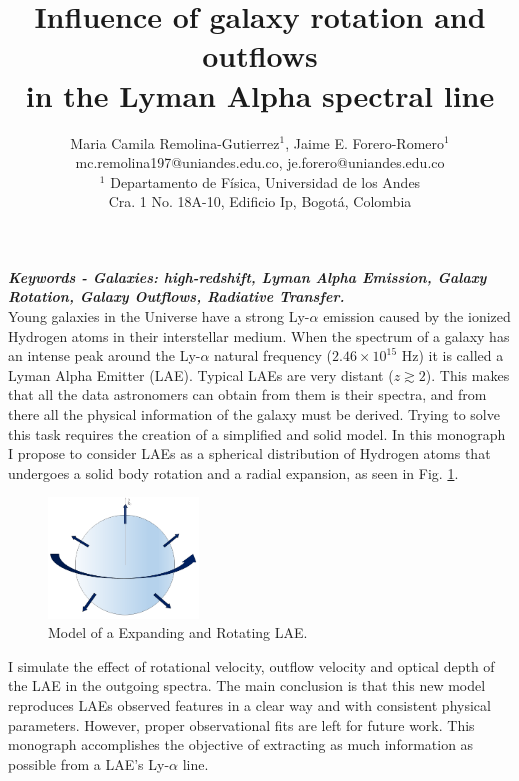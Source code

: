 \documentclass[11pt,a4paper]{article}
\begin{document}
\thispagestyle{empty}

\title{\textbf{Influence of galaxy rotation and outflows \\
			   in the Lyman Alpha spectral line}}
		
\author{Maria Camila Remolina-Gutierrez$^1$, Jaime E. Forero-Romero$^1$\\
	    mc.remolina197@uniandes.edu.co, \hspace{0.8mm} je.forero@uniandes.edu.co\\ 
		$^1$ Departamento de F\'{i}sica, Universidad de los Andes \\
		Cra. 1 No. 18A-10, Edificio Ip, Bogot\'a, Colombia}
\date{} %
\maketitle\thispagestyle{empty} %
\textit{\textbf{Keywords - Galaxies: high-redshift, Lyman Alpha Emission, Galaxy Rotation, Galaxy Outflows, Radiative Transfer.}}\\

Young galaxies in the Universe have a strong Ly-$\alpha$ emission caused by the ionized Hydrogen atoms in their interstellar medium. When the spectrum of a galaxy has an intense peak around the Ly-$\alpha$ natural frequency ($2.46\times 10^{15}$ Hz) it is called a Lyman Alpha Emitter (LAE). Typical LAEs are very distant ($z \gtrsim 2$). This makes that all the data astronomers can obtain from them is their spectra, and from there all the physical information of the galaxy must be derived. Trying to solve this task requires the creation of a simplified and solid model. In this monograph I propose to consider LAEs as a spherical distribution of Hydrogen atoms that undergoes a solid body rotation and a radial expansion, as seen in Fig. \ref{model}. 

\begin{figure}[h]
	\centerline{\includegraphics[width=4cm]{model.png}}
	\caption{Model of a Expanding and Rotating LAE.}
	\label{model}
\end{figure}

I simulate the effect of rotational velocity, outflow velocity and optical depth of the LAE in the outgoing spectra. The main conclusion is that this new model reproduces LAEs observed features in a clear way and with consistent physical parameters. However, proper observational fits are left for future work. This monograph accomplishes the objective of extracting as much information as possible from a LAE's Ly-$\alpha$ line.





\end{document}
